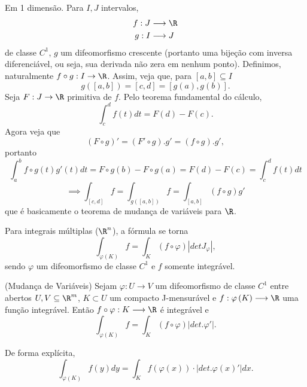 \begin{intuition}
    Em 1 dimensão. Para $I,J$ intervalos, 
    \begin{align*}
        f: J &\longrightarrow \R \\
        g: I &\longrightarrow J \\
    \end{align*}
    de classe $C^{1}$, $g$ um difeomorfismo crescente (portanto uma bijeção com inversa diferenciável, ou seja, sua derivada não zera em nenhum ponto). Definimos, naturalmente $f\circ g : I\to \R$. Assim, veja que, para $\left[ a,b \right] \subseteq I$\[
    g\left( \left[ a,b \right] \right) = \left[ c,d \right] = \left[ g\left( a \right) ,g\left( b \right)  \right] 
    .\] Seja $F: J\to \R$ primitiva de $f$. Pelo teorema fundamental do cálculo, \[
    \int_c^{d}f\left( t \right) dt = F\left( d \right) -F\left( c \right) 
    .\] Agora veja que \[
    \left( F \circ  g \right) ' = \left( F' \circ  g \right) . g' = \left( f \circ  g \right) . g'
    ,\] portanto \[
    \int_a^{b} f \circ  g \left( t \right) g'\left( t \right) dt = F \circ  g\left( b \right) - F \circ  g \left( a \right) = F\left( d \right) - F\left( c \right) = \int_c^{d}f\left( t \right) dt
    \] \[
    \implies \int_{\left[ c,d \right] } f = \int_{g\left( \left[ a,b \right]  \right) } f = \int_{\left[ a,b \right] } \left( f \circ  g \right) g' 
    \] que é basicamente o teorema de mudança de variáveis para $\R$.

    Para integrais múltiplas ($\R^{n}$), a fórmula se torna \[
    \int_{\varphi\left( K \right) } f = \int_K \left( f\circ \varphi \right) \left| det J_{\varphi} \right| 
    ,\] sendo $\varphi$ um difeomorfismo de classe $C^{1}$ e $f$ somente integrável.
\end{intuition}

\begin{theorem}
    (Mudança de Variáveis) Sejam $\varphi : U \to  V$ um difeomorfismo de classe $C^{1}$ entre abertos $U,V \subseteq \R^{m}$, $K\subset U$ um compacto J-mensurável e $f: \varphi\left( K \right)  \longrightarrow \R$ uma função integrável. Então $f\circ \varphi: K \longrightarrow \R$ é integrável e \[
    \int_{\varphi\left( K \right) } f = \int_K \left( f\circ \varphi \right) \left| det.  \varphi' \right| 
    .\]

    De forma explícita, \[
    \int_{\varphi\left( K \right) }f\left( y \right) dy = \int_K f\left( \varphi\left( x \right)  \right) \cdot \left| det. \varphi\left( x \right)' \right| dx
    .\] 
\end{theorem}

